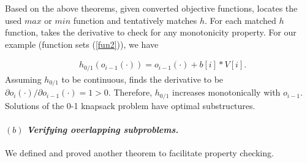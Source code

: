 
Based on the above theorems, given converted objective functions, \tool locates the used $max$ or $min$ function and tentatively matches $h$. 
For each matched $h$ function, \tool takes the derivative to check for any monotonicity property.
For our example (function sets (\ref{fun2})), we have 

\begin{align}
    & h_{0/1}(o_{i-1}(\cdot))=o_{i-1}(\cdot)+b[i]*V[i]. \nonumber
\end{align}
Assuming $h_{0/1}$ to be continuous, \tool finds the derivative to be $\partial o_i(\cdot)/\partial o_{i-1}(\cdot)=1>0$. Therefore, $h_{0/1}$ increases monotonically with $o_{i-1}$. Solutions of the 0-1 knapsack problem have   optimal substructures.  


\paragraph{$(b)$ \emph{Verifying overlapping subproblems.}} We defined and proved another theorem to facilitate property checking. 

